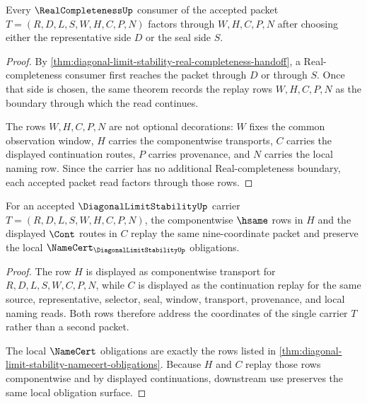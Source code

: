 \begin{theorem}
\label{thm:diagonal-limit-stability-window-coverage}
Every $\RealCompletenessUp$ consumer of the accepted packet $T=(R,D,L,S,W,H,C,P,N)$ factors through $W,H,C,P,N$ after choosing either the representative side $D$ or the seal side $S$.
\end{theorem}
\begin{proof}
By \autoref{thm:diagonal-limit-stability-real-completeness-handoff}, a Real-completeness consumer first reaches the packet through $D$ or through $S$. Once that side is chosen, the same theorem records the replay rows $W,H,C,P,N$ as the boundary through which the read continues.

The rows $W,H,C,P,N$ are not optional decorations: $W$ fixes the common observation window, $H$ carries the componentwise transports, $C$ carries the displayed continuation routes, $P$ carries provenance, and $N$ carries the local naming row. Since the carrier has no additional Real-completeness boundary, each accepted packet read factors through those rows.
\end{proof}

\begin{theorem}
\label{thm:diagonal-limit-stability-transport-replay}
For an accepted $\DiagonalLimitStabilityUp$ carrier $T=(R,D,L,S,W,H,C,P,N)$, the componentwise $\hsame$ rows in $H$ and the displayed $\Cont$ routes in $C$ replay the same nine-coordinate packet and preserve the local $\NameCert_{\DiagonalLimitStabilityUp}$ obligations.
\end{theorem}
\begin{proof}
The row $H$ is displayed as componentwise transport for $R,D,L,S,W,C,P,N$, while $C$ is displayed as the continuation replay for the same source, representative, selector, seal, window, transport, provenance, and local naming reads. Both rows therefore address the coordinates of the single carrier $T$ rather than a second packet.

The local $\NameCert$ obligations are exactly the rows listed in \autoref{thm:diagonal-limit-stability-namecert-obligations}. Because $H$ and $C$ replay those rows componentwise and by displayed continuations, downstream use preserves the same local obligation surface.
\end{proof}

